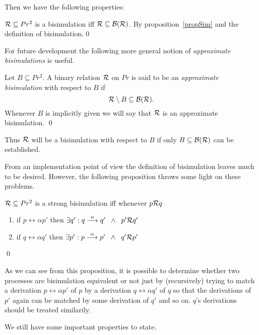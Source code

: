 \noindent
Then we have the following properties:

\begin{proposition}
${\cal R}\subseteq Pr^2$ is a bisimulation iff ${\cal R}\subseteq {\cal B}({\cal R})$.
\proof By proposition~\ref{propSim} and the definition of bisimulation.\qed
\end{proposition}

\noindent
For future development the following more general notion of {\em approximate bisimulations\/} is useful.

\begin{definition}\label{defApproximateBisimulation}
Let $B\subseteq Pr^2$. A binary relation $\cal R$ on $Pr$ is said to be an {\em approximate bisimulation\/} with respect to $B$ if
\[
{\cal R}\setminus B\subseteq {\cal B}({\cal R}).
\]
\noindent
Whenever $B$ is implicitly given we will say that $\cal R$ is an approximate bisimulation.
\qed
\end{definition}

\noindent
Thus $\cal R$ will be a bisimulation with respect to $B$ if only $B\subseteq {\cal B}({\cal R})$ can be established.

From an implementation point of view the definition of bisimulation leaves much to be desired. However, the following proposition throws some light on these problems.

\begin{proposition}
\label{propStrongBisim}
${\cal R}\subseteq Pr^2$ is a strong bisimulation iff whenever $p{\cal R}q$
\begin{enumerate}
\item if $p\rel{\alpha}p'$ then $\exists q': q\stackrel{\alpha}{\longrightarrow}q'\;\;\wedge\;\;p'{\cal R}q'$
\item if $q\rel{\alpha}q'$ then $\exists p': p\stackrel{\alpha}{\longrightarrow}p'\;\;\wedge\;\;q'{\cal R}p'$
\end{enumerate}
\qed
\end{proposition}

\noindent
As we can see from this proposition, it is possible to determine whether two processes are bisimulation equivalent or not just by (recursively) trying to match a derivation $p\rel{\alpha}p'$ of $p$ by a derivation $q\rel{\alpha}q'$ of $q$ so that the derivations of $p'$ again can be matched by some derivation of $q'$ and so on. $q$'s derivations should be treated similarily.

\noindent
We still have some important properties to state.

